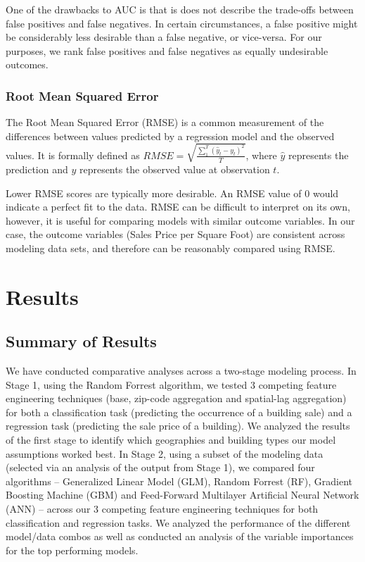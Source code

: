 \documentclass[12pt,]{article}
\begin{document}
One of the drawbacks to AUC is that is does not describe the trade-offs
between false positives and false negatives. In certain circumstances, a
false positive might be considerably less desirable than a false
negative, or vice-versa. For our purposes, we rank false positives and
false negatives as equally undesirable outcomes.

\hypertarget{root-mean-squared-error}{%
\subsubsection{Root Mean Squared Error}\label{root-mean-squared-error}}

The Root Mean Squared Error (RMSE) is a common measurement of the
differences between values predicted by a regression model and the
observed values. It is formally defined as
\(RMSE = \sqrt{ \frac{\sum_{1}^{T} (\hat{y}_t - y_t)^2}{T} }\), where
\(\hat{y}\) represents the prediction and \(y\) represents the observed
value at observation \(t\).

Lower RMSE scores are typically more desirable. An RMSE value of 0 would
indicate a perfect fit to the data. RMSE can be difficult to interpret
on its own, however, it is useful for comparing models with similar
outcome variables. In our case, the outcome variables (Sales Price per
Square Foot) are consistent across modeling data sets, and therefore can
be reasonably compared using RMSE.

\hypertarget{results}{%
\section{Results}\label{results}}

\hypertarget{summary-of-results}{%
\subsection{Summary of Results}\label{summary-of-results}}

We have conducted comparative analyses across a two-stage modeling
process. In Stage 1, using the Random Forrest algorithm, we tested 3
competing feature engineering techniques (base, zip-code aggregation and
spatial-lag aggregation) for both a classification task (predicting the
occurrence of a building sale) and a regression task (predicting the
sale price of a building). We analyzed the results of the first stage to
identify which geographies and building types our model assumptions
worked best. In Stage 2, using a subset of the modeling data (selected
via an analysis of the output from Stage 1), we compared four algorithms
-- Generalized Linear Model (GLM), Random Forrest (RF), Gradient
Boosting Machine (GBM) and Feed-Forward Multilayer Artificial Neural
Network (ANN) -- across our 3 competing feature engineering techniques
for both classification and regression tasks. We analyzed the
performance of the different model/data combos as well as conducted an
analysis of the variable importances for the top performing models.
\end{document}
